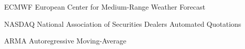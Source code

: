 \documentclass[
	12pt,				%
	openright,			%
	oneside,			%
	a4paper,			%
	english,			%
	french,				%
	spanish,			%
	brazil				%
	]{abntex2}
\begin{document}

 

 

  

\listoffigures*


\begin{siglas}
  \item[ECMWF] European Center for Medium-Range Weather Forecast
  \item[NASDAQ] National Association of Securities Dealers Automated Quotations
  \item[ARMA] Autoregressive Moving-Average
\end{siglas}

\end{document}
